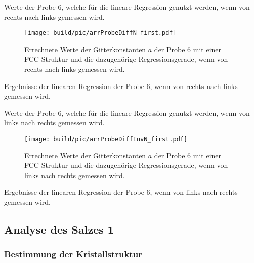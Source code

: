 \begin{table}[!ht]
    \centering
    \caption{Werte der Probe 6, welche für die lineare Regression genutzt werden, wenn von rechts nach links gemessen wird.}
    
    \label{tab:data_probe_fit_1}
\end{table}
\begin{figure}[!ht]
    \centering
    \texttt{[image: build/pic/arrProbeDiffN\_first.pdf]}
    \caption{Errechnete Werte der Gitterkonstanten $a$ der Probe 6 mit einer FCC-Struktur und die dazugehörige Regressionsgerade, wenn von rechts nach links gemessen wird.}
    \label{fig:data_probe_fit_1}
\end{figure}
\begin{table}[!ht]
    \centering
    \caption{Ergebnisse der linearen Regression der Probe 6, wenn von rechts nach links gemessen wird.}
    
    \label{tab:data_probe_fit_erg_1}
\end{table}
\begin{table}[!ht]
    \centering
    \caption{Werte der Probe 6, welche für die lineare Regression genutzt werden, wenn von links nach rechts gemessen wird.}
    
    \label{tab:data_probe_fit_inv_1}
\end{table}
\begin{figure}[!ht]
    \centering
    \texttt{[image: build/pic/arrProbeDiffInvN\_first.pdf]}
    \caption{Errechnete Werte der Gitterkonstanten $a$ der Probe 6 mit einer FCC-Struktur und die dazugehörige Regressionsgerade, wenn von links nach rechts gemessen wird.}
    \label{fig:data_probe_fit_inv_1}
\end{figure}
\begin{table}[!ht]
    \centering
    \caption{Ergebnisse der linearen Regression der Probe 6, wenn von links nach rechts gemessen wird.}
    
    \label{tab:data_probe_fit_erg_inv_1}
\end{table}

\clearpage
\subsection{Analyse des Salzes 1} %
\label{sub:analyse_des_salzes_1}

\subsubsection{Bestimmung der Kristallstruktur} %
\label{ssub:bestimmung_der_kristallstruktur_salz}


